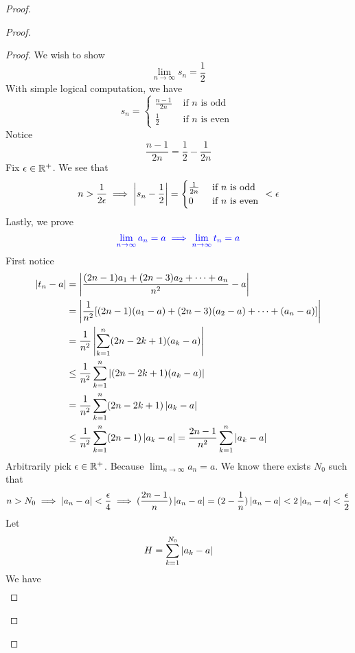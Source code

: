 \documentclass{report}
\begin{document}
\begin{proof}
\begin{proof}
\begin{proof}
We wish to show 
\begin{equation}
\lim_{n\to\infty}s_n=\frac{1}{2}
\end{equation}
With simple logical computation, we have
\begin{equation}
s_n=\begin{cases}
  \frac{n-1}{2n}& \text{ if $n$ is odd }\\
  \frac{1}{2}& \text{ if $n$ is even }
\end{cases}
\end{equation}
Notice 
\begin{equation}
\frac{n-1}{2n}=\frac{1}{2}-\frac{1}{2n}
\end{equation}
Fix $\epsilon \in\mathbb{R}^+$. We see that 
\begin{equation}
n>\frac{1}{2\epsilon }\implies \left|s_n-\frac{1}{2}\right|=\begin{cases}
\frac{1}{2n}& \text{ if $n$ is odd }\\
 0& \text{ if $n$ is even } 
\end{cases}<\epsilon 
\end{equation}
Lastly, we prove 
\begin{equation}
\textcolor{blue}{\lim_{n\to\infty}a_n=a\implies \lim_{n\to\infty}t_n=a}
\end{equation}
First notice
\begin{align}
  \left|t_n-a\right|&=\left|\frac{(2n-1)a_1+(2n-3)a_2+\cdots + a_n}{n^2}-a\right|\\
&=\left|\frac{1}{n^2}[(2n-1)(a_1-a)+(2n-3)(a_2-a)+\cdots +(a_n-a)]\right|\\
&=\frac{1}{n^2}\left|\sum_{k=1}^n (2n-2k+1)(a_k -a)\right|\\
&\leq \frac{1}{n^2}\sum_{k=1}^n \left|(2n-2k+1)(a_k-a)\right|\\
&= \frac{1}{n^2}\sum_{k=1}^n (2n-2k+1)\left|a_k-a\right|\\
&\leq \frac{1}{n^2}\sum_{k=1}^n (2n-1)\left|a_k-a\right|=\frac{2n-1}{n^2}\sum_{k=1}^n \left|a_k-a\right|
\end{align}
Arbitrarily pick $\epsilon \in\mathbb{R}^+$. Because $\lim_{n\to\infty}a_n=a$. We know there exists $N_0$ such that
 \begin{equation}
n>N_0\implies \left|a_n-a\right|<\frac{\epsilon }{4}\implies (\frac{2n-1}{n})\left|a_n-a\right|=(2-\frac{1}{n})\left|a_n-a\right|<2\left|a_n-a\right|<\frac{\epsilon}{2} 
\end{equation}
Let
\begin{equation}
H=\sum_{k=1}^{N_0} \left|a_k-a\right|
\end{equation}
We have
\begin{align}

\end{align}
\end{proof}
\end{proof}
\end{proof}
\end{document}
